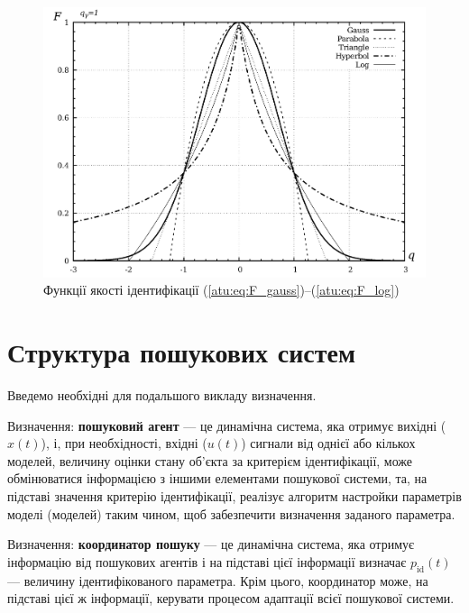 \begin{figure}[htb!]
  \begin{center}
    \includegraphics[width=55\TW]{p/F_types.png}
  \end{center}
  \caption{Функції якості ідентифікації (\ref{atu:eq:F_gauss})--(\ref{atu:eq:F_log})}
  \label{atu:f:F_types}
\end{figure}




\section{Структура пошукових систем} %


Введемо необхідні для подальшого викладу визначення.

Визначення:
\textbf{пошуковий агент} --- це динамічна система, яка отримує вихідні ($x(t)$),
і, при необхідності, вхідні ($u(t)$) сигнали від однієї або кількох моделей,
величину оцінки стану об'єкта за критерієм ідентифікації,
може обмінюватися інформацією з іншими елементами пошукової системи,
та, на підставі значення критерію
ідентифікації, реалізує алгоритм настройки параметрів моделі (моделей) таким
чином, щоб забезпечити визначення заданого параметра.

Визначення:
\textbf{координатор пошуку} --- це динамічна система, яка отримує інформацію
від пошукових агентів і на підставі цієї інформації визначає
$p_{\mathrm{id}}(t)$ --- величину ідентифікованого параметра.
Крім цього, координатор може, на підставі цієї ж інформації,
керувати процесом адаптації всієї пошукової системи.


